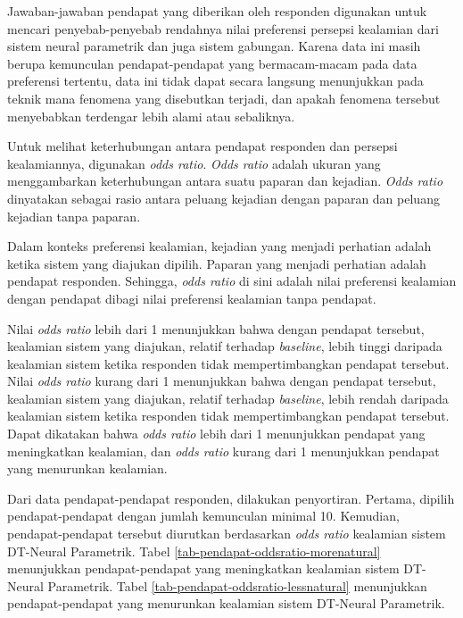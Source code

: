 Jawaban-jawaban pendapat yang diberikan oleh responden digunakan untuk mencari penyebab-penyebab rendahnya nilai preferensi persepsi kealamian dari sistem neural parametrik dan juga sistem gabungan. Karena data ini masih berupa kemunculan pendapat-pendapat yang bermacam-macam pada data preferensi tertentu, data ini tidak dapat secara langsung menunjukkan pada teknik mana fenomena yang disebutkan terjadi, dan apakah fenomena tersebut menyebabkan terdengar lebih alami atau sebaliknya.

Untuk melihat keterhubungan antara pendapat responden dan persepsi kealamiannya, digunakan \textit{odds ratio}. \textit{Odds ratio} adalah ukuran yang menggambarkan keterhubungan antara suatu paparan dan kejadian. \textit{Odds ratio} dinyatakan sebagai rasio antara peluang kejadian dengan paparan dan peluang kejadian tanpa paparan. \parencite{oddsratio}

Dalam konteks preferensi kealamian, kejadian yang menjadi perhatian adalah ketika sistem yang diajukan dipilih. Paparan yang menjadi perhatian adalah pendapat responden. Sehingga, \textit{odds ratio} di sini adalah nilai preferensi kealamian dengan pendapat dibagi nilai preferensi kealamian tanpa pendapat.

Nilai \textit{odds ratio} lebih dari 1 menunjukkan bahwa dengan pendapat tersebut, kealamian sistem yang diajukan, relatif terhadap \textit{baseline}, lebih tinggi daripada kealamian sistem ketika responden tidak mempertimbangkan pendapat tersebut. Nilai \textit{odds ratio} kurang dari 1 menunjukkan bahwa dengan pendapat tersebut, kealamian sistem yang diajukan, relatif terhadap \textit{baseline}, lebih rendah daripada kealamian sistem ketika responden tidak mempertimbangkan pendapat tersebut. Dapat dikatakan bahwa \textit{odds ratio} lebih dari 1 menunjukkan pendapat yang meningkatkan kealamian, dan \textit{odds ratio} kurang dari 1 menunjukkan pendapat yang menurunkan kealamian.

Dari data pendapat-pendapat responden, dilakukan penyortiran. Pertama, dipilih pendapat-pendapat dengan jumlah kemunculan minimal 10. Kemudian, pendapat-pendapat tersebut diurutkan berdasarkan \textit{odds ratio} kealamian sistem DT-Neural Parametrik. Tabel \ref{tab-pendapat-oddsratio-morenatural} menunjukkan pendapat-pendapat yang meningkatkan kealamian sistem DT-Neural Parametrik. Tabel \ref{tab-pendapat-oddsratio-lessnatural} menunjukkan pendapat-pendapat yang menurunkan kealamian sistem DT-Neural Parametrik.

